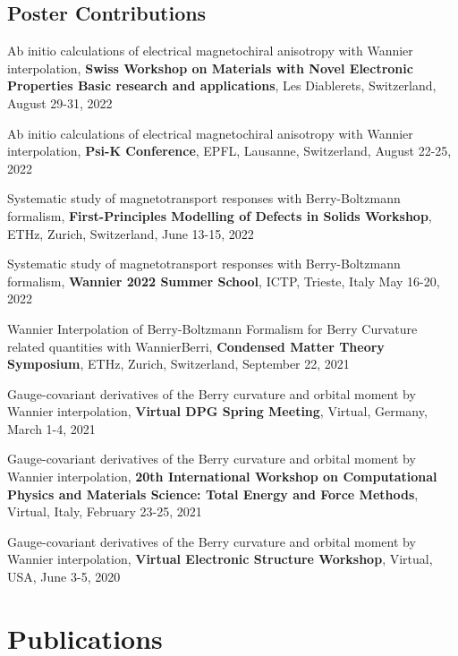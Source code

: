\documentclass[11pt,a4paper,sans]{moderncv} %
\begin{document}
\subsection{Poster Contributions}
\begin{etaremune}
  \item Ab initio calculations of electrical magnetochiral anisotropy with Wannier interpolation, \textbf{Swiss Workshop on Materials with Novel Electronic Properties Basic research and applications}, Les Diablerets, Switzerland, August 29-31, 2022
  \item Ab initio calculations of electrical magnetochiral anisotropy with Wannier interpolation, \textbf{Psi-K Conference}, EPFL, Lausanne, Switzerland, August 22-25, 2022
  \item Systematic study of magnetotransport responses with Berry-Boltzmann formalism, \textbf{First-Principles Modelling of Defects in Solids Workshop}, ETHz, Zurich, Switzerland, June 13-15, 2022
  \item Systematic study of magnetotransport responses with Berry-Boltzmann formalism, \textbf{Wannier 2022 Summer School}, ICTP, Trieste, Italy May 16-20, 2022
  \item Wannier Interpolation of Berry-Boltzmann Formalism for Berry Curvature related quantities with WannierBerri, \textbf{Condensed Matter Theory Symposium}, ETHz, Zurich, Switzerland, September 22, 2021
  \item Gauge-covariant derivatives of the Berry curvature and orbital moment by Wannier interpolation, \textbf{Virtual DPG Spring Meeting}, Virtual, Germany, March 1-4, 2021
  \item Gauge-covariant derivatives of the Berry curvature and orbital moment by Wannier interpolation, \textbf{20th International Workshop on Computational Physics and Materials Science: Total Energy and Force Methods}, Virtual, Italy, February 23-25, 2021
  \item Gauge-covariant derivatives of the Berry curvature and orbital moment by Wannier interpolation, \textbf{Virtual Electronic Structure Workshop}, Virtual, USA, June 3-5, 2020
\end{etaremune}


\section{Publications}
\end{document}
